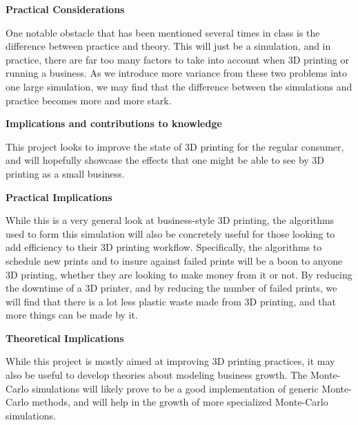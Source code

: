 \documentclass[11pt]{article}
\begin{document}
\bigbreak

\textbf{Practical Considerations}

One notable obstacle that has been mentioned several times in class is the difference between practice and theory. This will just be a simulation,
and in practice, there are far too many factors to take into account when 3D printing or running a business. As we introduce more variance from these two
problems into one large simulation, we may find that the difference between the simulations and practice becomes more and more stark.

\bigbreak


\begin{center}
    \LARGE
    \textbf{Implications and contributions to knowledge}
\end{center}

This project looks to improve the state of 3D printing for the regular consumer, and will hopefully showcase the effects that one might
be able to see by 3D printing as a small business.

\bigbreak

\textbf{Practical Implications}

While this is a very general look at business-style 3D printing, the algorithms used to form this simulation will also be concretely useful
for those looking to add efficiency to their 3D printing workflow. Specifically, the algorithms to schedule new prints and to insure against
failed prints will be a boon to anyone 3D printing, whether they are looking to make money from it or not. By reducing the downtime of a 3D printer,
and by reducing the number of failed prints, we will find that there is a lot less plastic waste made from 3D printing, and that more things can
be made by it.

\bigbreak

\textbf{Theoretical Implications}

While this project is mostly aimed at improving 3D printing practices, it may also be useful to develop theories about modeling
business growth. The Monte-Carlo simulations will likely prove to be a good implementation of generic Monte-Carlo methods, and
will help in the growth of more specialized Monte-Carlo simulations.
\end{document}
